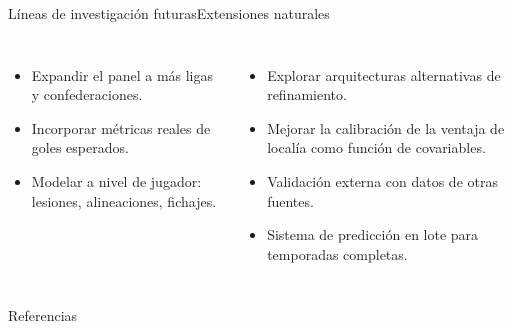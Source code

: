 \documentclass[aspectratio=169,11pt]{beamer}
\begin{document}
\begin{frame}{L\'ineas de investigaci\'on futuras}{Extensiones naturales}
	\vspace*{-0.6cm}
	\begin{columns}[T,onlytextwidth]
		\par\vskip 2mm
		\footnotesize
		\begin{itemize}
			\item Expandir el panel a m\'as ligas y confederaciones.
			\item Incorporar m\'etricas reales de goles esperados.
			\item Modelar a nivel de jugador: lesiones, alineaciones, fichajes.
		\end{itemize}
		\par\vskip 2mm
		\footnotesize
		\begin{itemize}
			\item Explorar arquitecturas alternativas de refinamiento.
			\item Mejorar la calibraci\'on de la ventaja de local\'ia como funci\'on de covariables.
			\item Validaci\'on externa con datos de otras fuentes.
			\item Sistema de predicci\'on en lote para temporadas completas.
		\end{itemize}
	\end{columns}
\end{frame}

\begin{frame}[allowframebreaks]{Referencias}
	\printbibliography[heading=none]
\end{frame}

\cierre
\end{document}
